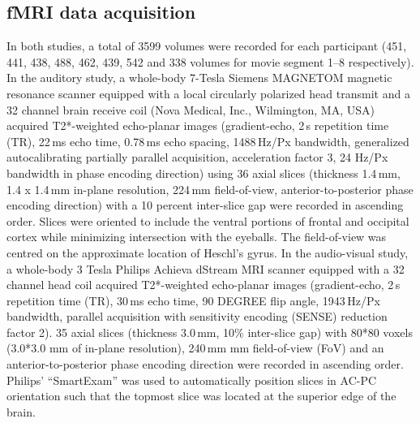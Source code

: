 \documentclass[english]{article}
\begin{document}
\subsection{fMRI data acquisition}
In both studies, a total of 3599 volumes were recorded for each participant (451, 441, 438, 488, 462, 439, 542 and 338 volumes for movie segment 1–8 respectively).
In the auditory study, a whole-body 7-Tesla Siemens MAGNETOM magnetic resonance scanner equipped with a local circularly polarized head transmit and a 32 channel brain receive coil (Nova Medical, Inc., Wilmington, MA, USA) acquired T2*-weighted echo-planar images (gradient-echo, 2\,s repetition time (TR), 22\,ms echo time, 0.78\,ms echo spacing, 1488\,Hz/Px bandwidth, generalized autocalibrating partially parallel acquisition, acceleration factor 3, 24 Hz/Px bandwidth in phase encoding direction) using 36 axial slices (thickness 1.4\,mm, 1.4 x 1.4\,mm in-plane resolution, 224\,mm field-of-view, anterior-to-posterior phase encoding direction) with a 10 percent inter-slice gap were recorded in ascending order.
Slices were oriented to include the ventral portions of frontal and occipital cortex while minimizing intersection with the eyeballs. The field-of-view was centred on the approximate location of Heschl's gyrus.
In the audio-visual study, a whole-body 3 Tesla Philips Achieva dStream MRI scanner equipped with a 32 channel head coil acquired T2*-weighted echo-planar images (gradient-echo, 2\,s repetition time (TR), 30\,ms echo time, 90 DEGREE flip angle, 1943\,Hz/Px bandwidth, parallel acquisition with sensitivity encoding (SENSE) reduction factor 2). 35 axial slices (thickness 3.0\,mm, 10\% inter-slice gap) with 80*80 voxels (3.0*3.0 mm of in-plane resolution), 240\,mm mm field-of-view (FoV) and an anterior-to-posterior phase encoding direction were recorded in ascending order. Philips’ “SmartExam” was used to automatically position slices in AC-PC orientation such that the topmost slice was located at the superior edge of the brain.
\end{document}
